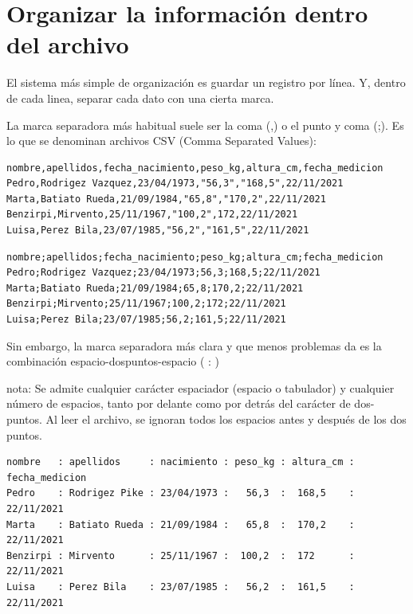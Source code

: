 \documentclass[spanish,12pt,a4paper,final,oneside]{book}
\begin{document}
\section{Organizar la información dentro del archivo}

El sistema más simple de organización es guardar un registro por línea. Y, dentro de cada linea, separar cada dato con una cierta marca.

La marca separadora más habitual suele ser la coma (,) o el punto y coma (;). Es lo que se denominan archivos CSV (Comma Separated Values):

\begin{lstlisting}[frame=single, basicstyle=\scriptsize]
nombre,apellidos,fecha_nacimiento,peso_kg,altura_cm,fecha_medicion
Pedro,Rodrigez Vazquez,23/04/1973,"56,3","168,5",22/11/2021
Marta,Batiato Rueda,21/09/1984,"65,8","170,2",22/11/2021
Benzirpi,Mirvento,25/11/1967,"100,2",172,22/11/2021
Luisa,Perez Bila,23/07/1985,"56,2","161,5",22/11/2021
\end{lstlisting}

\begin{lstlisting}[frame=single, basicstyle=\scriptsize]
nombre;apellidos;fecha_nacimiento;peso_kg;altura_cm;fecha_medicion
Pedro;Rodrigez Vazquez;23/04/1973;56,3;168,5;22/11/2021
Marta;Batiato Rueda;21/09/1984;65,8;170,2;22/11/2021
Benzirpi;Mirvento;25/11/1967;100,2;172;22/11/2021
Luisa;Perez Bila;23/07/1985;56,2;161,5;22/11/2021
\end{lstlisting}

Sin embargo, la marca separadora más clara y que menos problemas da es la combinación espacio-dospuntos-espacio ( : )

\begin{footnotesize}nota: Se admite cualquier carácter espaciador (espacio o tabulador) y cualquier número de espacios, tanto por delante como por detrás del carácter de dos-puntos. Al leer el archivo, se ignoran todos los espacios antes y después de los dos puntos.\end{footnotesize}

\begin{lstlisting}[frame=single, basicstyle=\scriptsize]
nombre   : apellidos     : nacimiento : peso_kg : altura_cm : fecha_medicion
Pedro    : Rodrigez Pike : 23/04/1973 :   56,3  :  168,5    : 22/11/2021
Marta    : Batiato Rueda : 21/09/1984 :   65,8  :  170,2    : 22/11/2021
Benzirpi : Mirvento      : 25/11/1967 :  100,2  :  172      : 22/11/2021
Luisa    : Perez Bila    : 23/07/1985 :   56,2  :  161,5    : 22/11/2021
\end{lstlisting}
\end{document}
